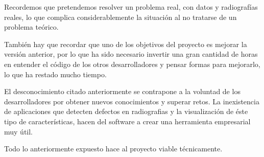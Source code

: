 Recordemos que pretendemos resolver un problema real, con datos y radiografías reales, lo que complica considerablemente la situación al no tratarse de un problema teórico.

También hay que recordar que uno de los objetivos del proyecto es mejorar la versión anterior, por lo que ha sido necesario invertir una gran cantidad de horas en entender el código de los otros desarrolladores y pensar formas para mejorarlo, lo que ha restado mucho tiempo.

El desconocimiento citado anteriormente se contrapone a la voluntad de los desarrolladores por obtener nuevos conocimientos y superar retos. La inexistencia de aplicaciones que detecten defectos en radiografias y la visualización de éste tipo de características, hacen del software a crear una herramienta empresarial muy útil.

Todo lo anteriormente expuesto hace al proyecto viable técnicamente.